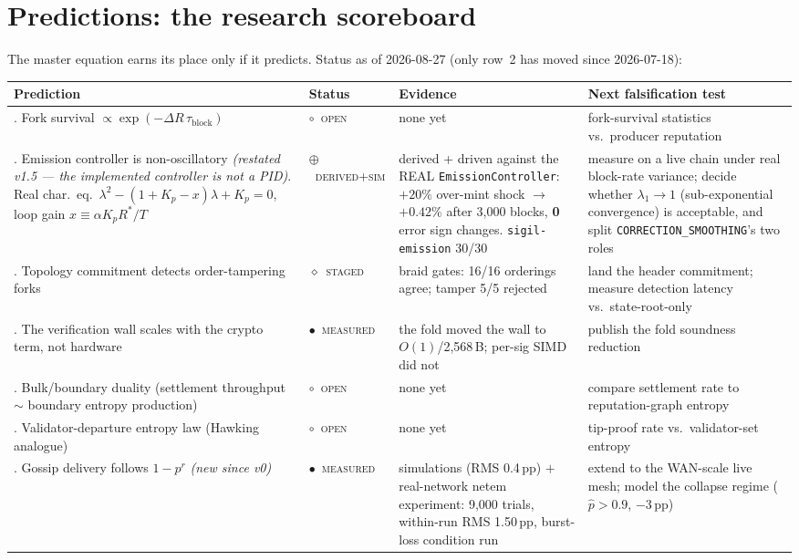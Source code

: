 \documentclass[10pt,a4paper]{article}
\newcommand{\stM}{\textcolor{sigilcyan}{$\bullet$}~{\scriptsize\textcolor{sigilcyan}{\textsc{measured}}}}
\newcommand{\stD}{\textcolor{sigilblue}{$\oplus$}~{\scriptsize\textcolor{sigilblue}{\textsc{derived+sim}}}}
\newcommand{\stG}{\textcolor{sigilviolet}{$\diamond$}~{\scriptsize\textcolor{sigilviolet}{\textsc{staged}}}}
\newcommand{\stO}{\textcolor{sigilamber}{$\circ$}~{\scriptsize\textcolor{sigilamber}{\textsc{open}}}}
\begin{document}
\section{Predictions: the research scoreboard}\label{sec:predictions}

The master equation earns its place only if it predicts. Status as of 2026-08-27 (only row~2 has moved since 2026-07-18):

\begin{center}
\small
{}
\renewcommand{\arraystretch}{1.5}
\begin{tabularx}{\textwidth}{@{}>{\RaggedRight\arraybackslash}p{4.9cm}l>{\RaggedRight\arraybackslash}p{3.6cm}>{\RaggedRight\arraybackslash}X@{}}
\toprule
Prediction & Status & Evidence & Next falsification test \\
\midrule
1. Fork survival $\propto \exp(-\Delta R\,\tau_{\mathrm{block}})$ & \stO & none yet &
fork-survival statistics vs.\ producer reputation \\
2. Emission controller is non-oscillatory \emph{(restated v1.5 --- the
implemented controller is not a PID)}. Real char.\ eq.\
$\lambda^2-(1{+}K_p{-}x)\lambda+K_p=0$, loop gain $x\equiv\alpha K_pR^*/T$ &
\stD & derived + driven against the REAL \texttt{EmissionController}: $+20\%$
over-mint shock $\to$ $+0.42\%$ after 3{,}000 blocks, \textbf{0} error sign
changes. \texttt{sigil-emission} 30/30 & measure on a live chain under real
block-rate variance; decide whether $\lambda_1\!\to\!1$ (sub-exponential
convergence) is acceptable, and split \texttt{CORRECTION\_SMOOTHING}'s two roles \\
3. Topology commitment detects order-tampering forks & \stG & braid gates: 16/16
orderings agree; tamper 5/5 rejected & land the header commitment; measure detection
latency vs.\ state-root-only \\
4. The verification wall scales with the crypto term, not hardware & \stM & the fold
moved the wall to $O(1)$/2{,}568\,B; per-sig SIMD did not & publish the fold soundness
reduction \\
5. Bulk/boundary duality (settlement throughput $\sim$ boundary entropy production) &
\stO & none yet & compare settlement rate to reputation-graph entropy \\
6. Validator-departure entropy law (Hawking analogue) & \stO & none yet & tip-proof
rate vs.\ validator-set entropy \\
7. Gossip delivery follows $1-p^r$ \emph{(new since v0)} & \stM & 22 simulations
(RMS 0.4\,pp) $+$ real-network netem experiment: 9{,}000 trials, within-run RMS
1.50\,pp, burst-loss condition run & extend to the WAN-scale live mesh; model the
collapse regime ($\hat p{>}0.9$, $-3$\,pp) \\
\bottomrule
\end{tabularx}
\end{center}
\end{document}
